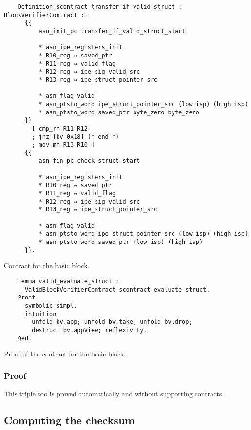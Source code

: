 \begin{listing}[htbp]
  \begin{verbatim}
    Definition scontract_transfer_if_valid_struct : BlockVerifierContract :=
      {{
          asn_init_pc transfer_if_valid_struct_start

          * asn_ipe_registers_init
          * R10_reg ↦ saved_ptr
          * R11_reg ↦ valid_flag
          * R12_reg ↦ ipe_sig_valid_src
          * R13_reg ↦ ipe_struct_pointer_src

          * asn_flag_valid
          * asn_ptsto_word ipe_struct_pointer_src (low isp) (high isp)
          * asn_ptsto_word saved_ptr byte_zero byte_zero
      }}
        [ cmp_rm R11 R12
        ; jnz [bv 0x18] (* end *)
        ; mov_mm R13 R10 ]
      {{
          asn_fin_pc check_struct_start

          * asn_ipe_registers_init
          * R10_reg ↦ saved_ptr
          * R11_reg ↦ valid_flag
          * R12_reg ↦ ipe_sig_valid_src
          * R13_reg ↦ ipe_struct_pointer_src

          * asn_flag_valid
          * asn_ptsto_word ipe_struct_pointer_src (low isp) (high isp)
          * asn_ptsto_word saved_ptr (low isp) (high isp)
      }}.
  \end{verbatim}
  \caption{Contract for the  basic block.}
  \label{lst:transfer}
\end{listing}

\begin{listing}[p]
  \begin{verbatim}
    Lemma valid_evaluate_struct :
      ValidBlockVerifierContract scontract_evaluate_struct.
    Proof.
      symbolic_simpl.
      intuition;
        unfold bv.app; unfold bv.take; unfold bv.drop;
        destruct bv.appView; reflexivity.
    Qed.
  \end{verbatim}
  \caption{Proof of the contract for the  basic block.}
  \label{lst:evaluate_struct-proof}
\end{listing}

\subsubsection{Proof}

This triple too is proved automatically and without supporting contracts.

\subsection{Computing the checksum}

